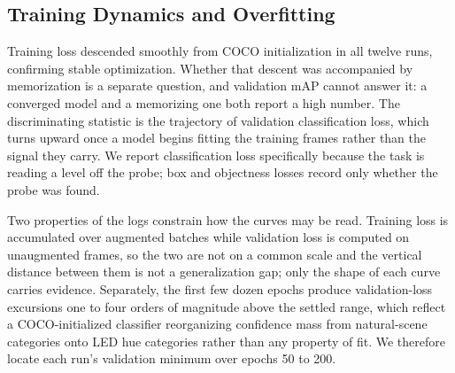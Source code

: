﻿\documentclass[journal]{IEEEtran}
\begin{document}
\subsection{Training Dynamics and Overfitting}
\label{sec:dynamics}
Training loss descended smoothly from COCO initialization in all twelve runs, confirming stable optimization. Whether that descent was accompanied by memorization is a separate question, and validation mAP cannot answer it: a converged model and a memorizing one both report a high number. The discriminating statistic is the trajectory of validation classification loss, which turns upward once a model begins fitting the training frames rather than the signal they carry. We report classification loss specifically because the task is reading a level off the probe; box and objectness losses record only whether the probe was found.

Two properties of the logs constrain how the curves may be read. Training loss is accumulated over augmented batches while validation loss is computed on unaugmented frames, so the two are not on a common scale and the vertical distance between them is not a generalization gap; only the shape of each curve carries evidence. Separately, the first few dozen epochs produce validation-loss excursions one to four orders of magnitude above the settled range, which reflect a COCO-initialized classifier reorganizing confidence mass from natural-scene categories onto LED hue categories rather than any property of fit. We therefore locate each run's validation minimum over epochs 50 to 200.
\end{document}

